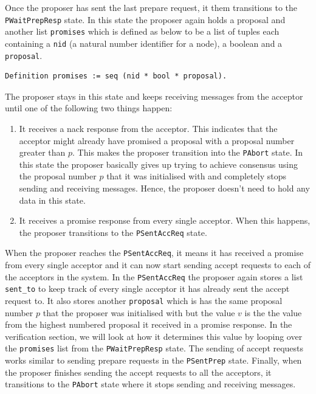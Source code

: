 Once the proposer has sent the last prepare request, it them transitions to
the \texttt{PWaitPrepResp} state. In this state the proposer again holds a proposal and
another list \texttt{promises} which is defined as below to be a list of tuples
each containing a \texttt{nid} (a natural number identifier for a node), a boolean
and a \texttt{proposal}.

\begin{lstlisting}
Definition promises := seq (nid * bool * proposal).
\end{lstlisting}

The proposer stays in this state and keeps receiving messages from the acceptor
until one of the following two things happen:
\begin{enumerate}
  \item It receives a nack response from the acceptor. This indicates that the
    acceptor might already have promised a proposal
    with a proposal number greater than $p$. This makes the proposer
    transition into the \texttt{PAbort} state. In this state the proposer basically
    gives up trying to achieve consensus using the proposal number $p$ that it was
    initialised with and completely stops sending and receiving messages. Hence,
    the proposer doesn't need to hold any data in this state.
  \item It receives a promise response from every single acceptor. When this
    happens, the proposer transitions to the \texttt{PSentAccReq} state.
\end{enumerate}

When the proposer reaches the \texttt{PSentAccReq}, it means it has received a promise
from every single acceptor and it can now start sending accept requests to each
of the acceptors in the system. In the \texttt{PSentAccReq} the proposer again stores
a list \texttt{sent\_to} to keep track of every single acceptor it has already sent the
accept request to. It also stores another \texttt{proposal} which is has the same
proposal number $p$ that the proposer was initialised with but the value $v$ is the
the value from the highest numbered proposal it received in a promise response.
In the verification section, we will look at how it determines this value by looping over
the \texttt{promises} list from the \texttt{PWaitPrepResp} state. The sending of
accept requests works similar to sending prepare requests in the
\texttt{PSentPrep} state. Finally, when the proposer finishes sending the
accept requests to all the acceptors, it transitions to the \texttt{PAbort}
state where it stops sending and receiving messages.


